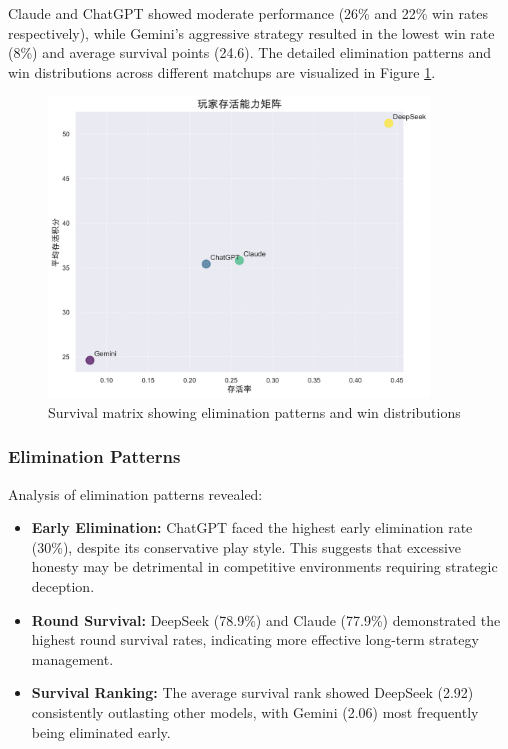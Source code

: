\documentclass{article}
\begin{document}
Claude and ChatGPT showed moderate performance (26\% and 22\% win rates respectively), while Gemini's aggressive strategy resulted in the lowest win rate (8\%) and average survival points (24.6). The detailed elimination patterns and win distributions across different matchups are visualized in Figure \ref{fig:survival_matrix}.

\begin{figure}[H]
    \centering
    \includegraphics[width=0.9\textwidth]{figures/survival_matrix.png}
    \caption{Survival matrix showing elimination patterns and win distributions}
    \label{fig:survival_matrix}
\end{figure}

\subsubsection{Elimination Patterns}
Analysis of elimination patterns revealed:
\begin{itemize}
    \item \textbf{Early Elimination:} ChatGPT faced the highest early elimination rate (30\%), despite its conservative play style. This suggests that excessive honesty may be detrimental in competitive environments requiring strategic deception.
    \item \textbf{Round Survival:} DeepSeek (78.9\%) and Claude (77.9\%) demonstrated the highest round survival rates, indicating more effective long-term strategy management.
    \item \textbf{Survival Ranking:} The average survival rank showed DeepSeek (2.92) consistently outlasting other models, with Gemini (2.06) most frequently being eliminated early.
\end{itemize}
\end{document}
